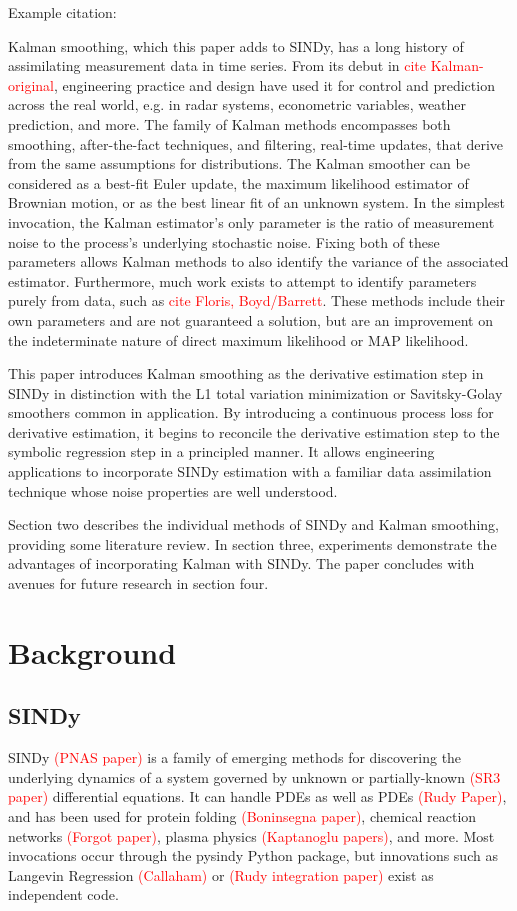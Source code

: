 \documentclass{article}
\newcommand{\red}[1]{\textcolor{red}{#1}}
\begin{document}
Example citation: \cite{Raissi2019}

Kalman smoothing, which this paper adds to SINDy, has a long history of assimilating measurement data in time series.
From its debut in \red{cite Kalman-original}, engineering practice and design have used it for control and prediction across the real world, e.g. in radar systems, econometric variables, weather prediction, and more.
The family of Kalman methods encompasses both smoothing, after-the-fact techniques, and filtering, real-time updates, that derive from the same assumptions for distributions.
The Kalman smoother can be considered as a best-fit Euler update, the maximum likelihood estimator of Brownian motion, or as the best linear fit of an unknown system.
In the simplest invocation, the Kalman estimator's only parameter is the ratio of measurement noise to the process's underlying stochastic noise.
Fixing both of these parameters allows Kalman methods to also identify the variance of the associated estimator.
Furthermore, much work exists to attempt to identify parameters purely from data, such as \red{cite Floris, Boyd/Barrett}.
These methods include their own parameters and are not guaranteed a solution, but are an improvement on the indeterminate nature of direct maximum likelihood or MAP likelihood.

This paper introduces Kalman smoothing as the derivative estimation step in SINDy in distinction with the L1 total variation minimization or Savitsky-Golay smoothers common in application.
By introducing a continuous process loss for derivative estimation, it begins to reconcile the derivative estimation step to the symbolic regression step in a principled manner.
It allows engineering applications to incorporate SINDy estimation with a familiar data assimilation technique whose noise properties are well understood.

Section two describes the individual methods of SINDy and Kalman smoothing, providing some literature review.  In section three, experiments demonstrate the advantages of incorporating Kalman with SINDy.  The paper concludes with avenues for future research in section four.

\section{Background}

\subsection{SINDy}
SINDy \red{(PNAS paper)} is a family of emerging methods for discovering the underlying dynamics of a system governed by unknown or partially-known \red{(SR3 paper)} differential equations.  It can handle PDEs as well as PDEs \red{(Rudy Paper)}, and has been used for protein folding \red{(Boninsegna paper)}, chemical reaction networks \red{(Forgot paper)}, plasma physics \red{(Kaptanoglu papers)}, and more.  Most invocations occur through the pysindy Python package, but innovations such as Langevin Regression \red{(Callaham)} or \red{(Rudy integration paper)} exist as independent code.
\end{document}
